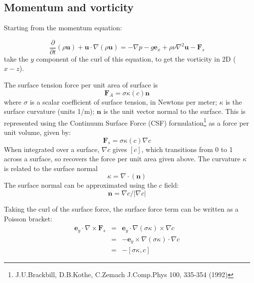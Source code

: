 \documentclass[12pt,a4paper]{article}
\begin{document}
\subsection{Momentum and vorticity}

Starting from the momentum equation:

\begin{equation}
\frac{\partial}{\partial t}\left(\rho \mathbf{u}\right) + \mathbf{u}\cdot\nabla\left(\rho\mathbf{u}\right) = -\nabla p - g\mathbf{e}_x + \rho\nu\nabla^2\mathbf{u} - \mathbf{F}_s
\end{equation}
take the $y$ component of the curl of this equation, to get
the vorticity in 2D ($x-z$).

The surface tension force per unit area of surface is
\begin{equation}
\mathbf{F}_A = \sigma\kappa\left(c\right)\mathbf{n}
\end{equation}
where $\sigma$ is a scalar coefficient of surface tension,
in Newtons per meter; $\kappa$ is the surface curvature (units 1/m); $\mathbf{n}$ is the unit vector normal to the surface.
This is represented using the Continuum Surface Force (CSF) formulation\footnote{J.U.Brackbill, D.B.Kothe, C.Zemach J.Comp.Phys 100, 335-354 (1992)} as a force per unit volume, given by:
\begin{equation}
\mathbf{F}_s = \sigma\kappa\left(c\right)\nabla c
\end{equation}
When integrated over a surface, $\nabla c$ gives $\left[c\right]$, which transitions from 0 to 1 across a surface, so recovers the force per unit area given above. 
The curvature $\kappa$ is related to the surface normal
\begin{equation}
\kappa = \nabla\cdot\left(\mathbf{n}\right)
\end{equation}
The surface normal can be approximated using the $c$ field:
\begin{equation}
\mathbf{n} = \nabla c / \left|\nabla c\right|
\end{equation}

Taking the curl of the surface force, the surface force term can be written 
as a Poisson bracket:
\begin{eqnarray}
\mathbf{e}_y\cdot\nabla\times \mathbf{F}_s &=& \mathbf{e}_y\cdot\nabla\left(\sigma\kappa\right)\times\nabla c \\
&=& -\mathbf{e}_y\times\nabla\left(\sigma\kappa\right)\cdot\nabla c \\
&=& -\left[\sigma\kappa, c\right]
\end{eqnarray}
\end{document}
